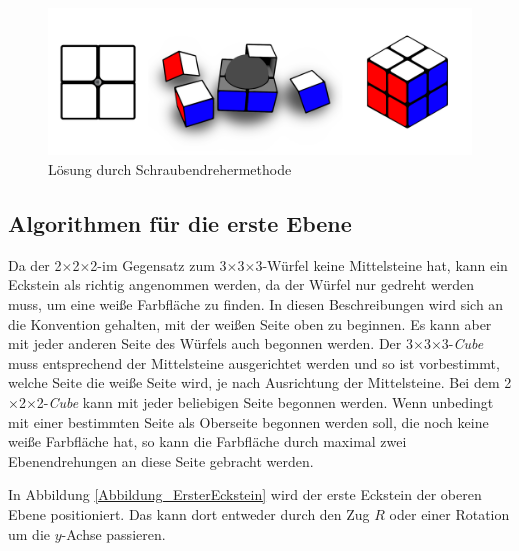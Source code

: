 \documentclass[12pt,a4paper, usenames, dvipsnames]{article}
\theoremstyle{mystyle}
\theoremstyle{definition}
\newcommand{\Ttwo}{2$\times$2$\times$2-}
\newcommand{\Tthree}{3$\times$3$\times$3-}
\begin{document}
\begin{figure}[H]
\centering
\includegraphics[scale=0.2]{schraube_m.png}
\caption{Lösung durch Schraubendrehermethode}
\label{Abbildung_Schraubendrehermethode}
\end{figure}

%
%
%
%
%
%
%
%
%
%
%
%
%
%
%
%
%
%
%
\subsection{Algorithmen für die erste Ebene}

Da der \Ttwo im Gegensatz zum \Tthree Würfel keine Mittelsteine hat, kann ein Eckstein als richtig angenommen werden, da der Würfel nur gedreht werden muss, um eine weiße Farbfläche zu finden.
In diesen Beschreibungen wird sich an die Konvention gehalten, mit der weißen Seite oben zu beginnen. Es kann aber mit jeder anderen Seite des Würfels auch begonnen werden.
Der \Tthree \textit{Cube} muss entsprechend der Mittelsteine ausgerichtet werden und so ist vorbestimmt, welche Seite die weiße Seite wird, je nach Ausrichtung der Mittelsteine. Bei dem \Ttwo \textit{Cube} kann mit jeder beliebigen Seite begonnen werden. Wenn unbedingt mit einer bestimmten Seite als Oberseite begonnen werden soll, die noch keine weiße Farbfläche hat, so kann die Farbfläche durch maximal zwei Ebenendrehungen an diese Seite gebracht werden.

In Abbildung \ref{Abbildung_ErsterEckstein} wird der erste Eckstein der oberen Ebene positioniert. Das kann dort entweder durch den Zug $R$ oder einer Rotation um die $y$-Achse passieren.
\end{document}
